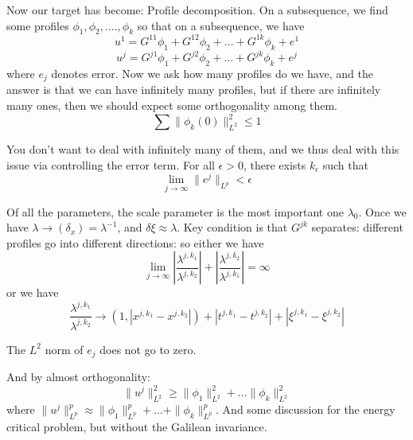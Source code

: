 Now our target has become: Profile decomposition. On a subsequence, we find some profiles $\phi_1, \phi_2, ...., \phi_k$ so that on a subsequence, we have
\begin{equation*}
    u^1=G^{11}\phi_1+G^{12}\phi_2+...+G^{1k}\phi_k+e^1
\end{equation*}
\begin{equation*}
    u^j=G^{j1}\phi_1+G^{j2}\phi_2+...+G^{jk}\phi_k+e^j
\end{equation*}
where $e_j$ denotes error. Now we ask how many profiles do we have, and the answer is that we can have infinitely many profiles, but if there are infinitely many ones, then we should expect some orthogonality among them.
\begin{equation*}
    \sum\|\phi_k(0)\|_{L^2}^2\leq 1
\end{equation*}
\begin{note}
    You don't want to deal with infinitely many of them, and we thus deal with this issue via controlling the error term. For all $\epsilon>0$, there exists $k_\epsilon$ such that
    \begin{equation*}
        \lim_{j\to\infty}\|e^j\|_{L^p}<\epsilon
    \end{equation*}
\end{note}

Of all the parameters, the scale parameter is the most important one $\lambda_0$. Once we have $\lambda\to (\delta_x)=\lambda^{-1}$, and $\delta\xi\approx\lambda$. Key condition is that $G^{jk}$ separates: different profiles go into different directions: so either we have
\begin{equation*}
    \lim_{j\to\infty}\left|\frac{\lambda^{j,k_1}}{\lambda^{j, k_2}}\right|+\left|\frac{\lambda^{j,k_2}}{\lambda^{j, k_1}}\right|=\infty
\end{equation*}
or we have
\begin{equation*}
    \frac{\lambda^{j,k_1}}{\lambda^{j,k_2}}\to (1, |x^{j, k_1}-x^{j, k_2}|)+|t^{j, k_1}-t^{j, k_2}|+|\xi^{j, k_1}-\xi^{j, k_2}|
\end{equation*}
\begin{note}
    The $L^2$ norm of $e_j$ does not go to zero.
\end{note}
And by almost orthogonality:
\begin{equation*}
    \|u^j\|_{L^2}^2\geq\|\phi_1\|_{L^2}^2+...\|\phi_k\|_{L^2}^2
\end{equation*}
where $\|u^j\|_{L^p}^p\approx\|\phi_1\|_{L^p}^p+...+\|\phi_k\|_{L^p}^p$. And some discussion for the energy critical problem, but without the Galilean invariance.


